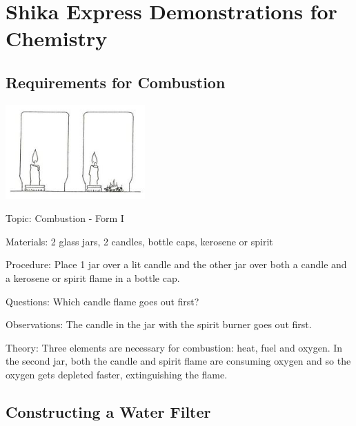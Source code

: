 \section{Shika Express Demonstrations for Chemistry}

\begin{multicols}{2}


\subsection{Requirements for Combustion}

\begin{center}
\includegraphics[width=0.4\textwidth]{./img/source/flame-extinguisher.jpg}
\end{center}

\begin{description*}
\item[Topic:]{Combustion - Form I}
\item[Materials:]{2 glass jars, 2 candles, bottle caps, kerosene or spirit}
\item[Procedure:]{Place 1 jar over a lit candle and the other jar over both a candle and a kerosene or spirit flame in a bottle cap.}
\item[Questions:]{Which candle flame goes out first?}
\item[Observations:]{The candle in the jar with the spirit burner goes out first.}
\item[Theory:]{Three elements are necessary for combustion: heat, fuel and oxygen. In the second jar, both the candle and spirit flame are consuming oxygen and so the oxygen gets depleted faster, extinguishing the flame.}
\end{description*}

\subsection{Constructing a Water Filter}


\end{multicols}

